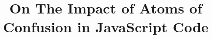 \documentclass[10pt,conference,blind]{IEEEtran}
\begin{document}


\title{On The Impact of Atoms of Confusion in JavaScript
Code}

\author{}



\maketitle
\end{document}
